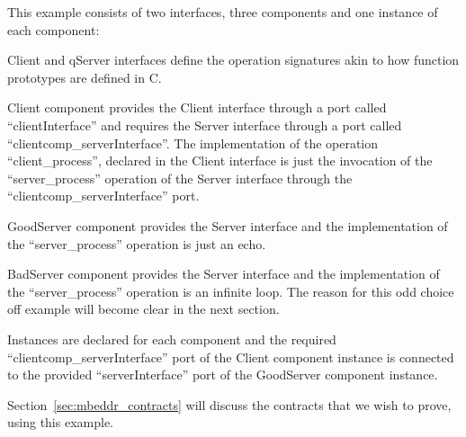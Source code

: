 
This example consists of two interfaces, three components and one instance of
each component:
\begin{compactdesc}
\item[Client and qServer interfaces] define the operation signatures akin to how
function prototypes are defined in C.

\item[Client component] provides the Client interface through a port called
``clientInterface'' and requires the Server interface through a port called
``clientcomp\_serverInterface''. The implementation of the operation
``client\_process'', declared in the Client interface is just the invocation of
the ``server\_process'' operation of the Server interface through the
``clientcomp\_serverInterface'' port.

\item[GoodServer component] provides the Server interface and the implementation
of the ``server\_process'' operation is just an echo.

\item[BadServer component] provides the Server interface and the implementation
of the ``server\_process'' operation is an infinite loop. The reason for this
odd choice off example will become clear in the next section.

\item[Instances] are declared for each component and the required
``clientcomp\_serverInterface'' port of the Client component instance is
connected to the provided ``serverInterface'' port of the GoodServer component
instance.
\end{compactdesc}

Section~\ref{sec:mbeddr_contracts} will discuss the contracts that we wish to prove, using this example.

